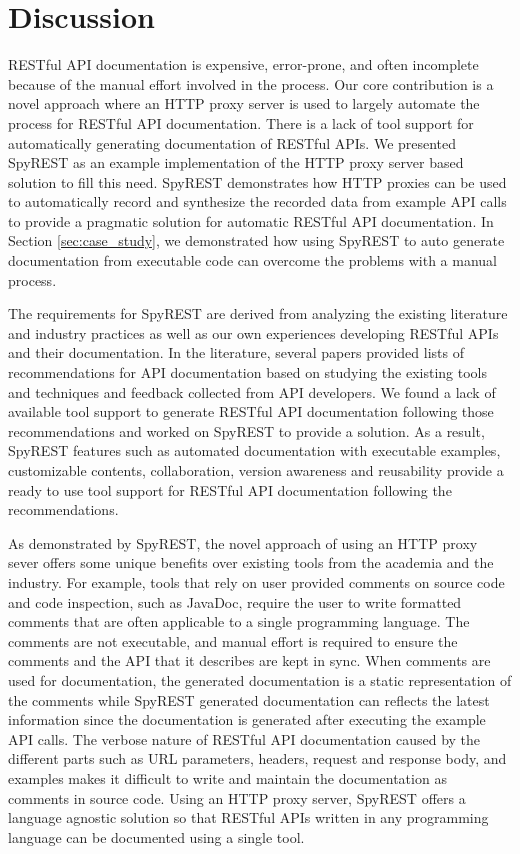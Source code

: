 \documentclass[conference]{IEEEtran}
\begin{document}
\section{Discussion}
RESTful API documentation is expensive, error-prone, and often incomplete because of the manual effort involved in the process. Our core contribution is a novel approach where an HTTP proxy server is used to largely automate the process for RESTful API documentation. There is a lack of tool support for automatically generating documentation of RESTful APIs. We presented SpyREST as an example implementation of the HTTP proxy server based solution to fill this need. SpyREST demonstrates how HTTP proxies can be used to automatically record and synthesize the recorded data from example API calls to provide a pragmatic solution for automatic RESTful API documentation. In Section \ref{sec:case_study}, we demonstrated how using SpyREST to auto generate documentation from executable code can overcome the problems with a manual process.

The requirements for SpyREST are derived from analyzing the existing literature and industry practices as well as our own experiences developing RESTful APIs and their documentation. In the literature, several papers provided lists of recommendations for API documentation based on studying the existing tools and techniques and feedback collected from API developers. We found a lack of available tool support to generate RESTful API documentation following those recommendations and worked on SpyREST to provide a solution. As a result, SpyREST features such as automated documentation with executable examples, customizable contents, collaboration, version awareness and reusability provide a ready to use tool support for RESTful API documentation following the recommendations.

As demonstrated by SpyREST, the novel approach of using an HTTP proxy sever offers some unique benefits over existing tools from the academia and the industry. For example, tools that rely on user provided comments on source code and code inspection, such as JavaDoc, require the user to write formatted comments that are often applicable to a single programming language. The comments are not executable, and manual effort is required to ensure the comments and the API that it describes are kept in sync. When comments are used for documentation, the generated documentation is a static representation of the comments while SpyREST generated documentation can reflects the latest information since the documentation is generated after executing the example API calls. The verbose nature of RESTful API documentation caused by the different parts such as URL parameters, headers, request and response body, and examples makes it difficult to write and maintain the documentation as comments in source code. Using an HTTP proxy server, SpyREST offers a language agnostic solution so that RESTful APIs written in any programming language can be documented using a single tool.
\end{document}
